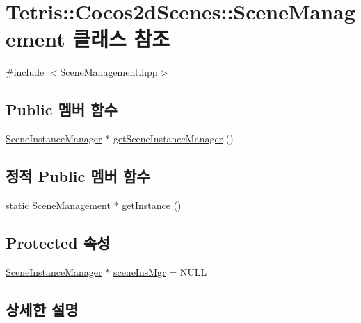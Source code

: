 \hypertarget{class_tetris_1_1_cocos2d_scenes_1_1_scene_management}{}\section{Tetris\+:\+:Cocos2d\+Scenes\+:\+:Scene\+Management 클래스 참조}
\label{class_tetris_1_1_cocos2d_scenes_1_1_scene_management}


{\ttfamily \#include $<$Scene\+Management.\+hpp$>$}

\subsection*{Public 멤버 함수}
\begin{DoxyCompactItemize}
\item 
\hyperlink{class_tetris_1_1_cocos2d_scenes_1_1_scene_instance_manager}{Scene\+Instance\+Manager} $\ast$ \hyperlink{class_tetris_1_1_cocos2d_scenes_1_1_scene_management_a4a4ea58177afffd49857182c961eb5f3}{get\+Scene\+Instance\+Manager} ()
\end{DoxyCompactItemize}
\subsection*{정적 Public 멤버 함수}
\begin{DoxyCompactItemize}
\item 
static \hyperlink{class_tetris_1_1_cocos2d_scenes_1_1_scene_management}{Scene\+Management} $\ast$ \hyperlink{class_tetris_1_1_cocos2d_scenes_1_1_scene_management_a34a3edec2de526ee179491cc6ae8aac3}{get\+Instance} ()
\end{DoxyCompactItemize}
\subsection*{Protected 속성}
\begin{DoxyCompactItemize}
\item 
\hyperlink{class_tetris_1_1_cocos2d_scenes_1_1_scene_instance_manager}{Scene\+Instance\+Manager} $\ast$ \hyperlink{class_tetris_1_1_cocos2d_scenes_1_1_scene_management_a0ac07876072adcaefdcb86f9911475ba}{scene\+Ins\+Mgr} = N\+U\+LL
\end{DoxyCompactItemize}


\subsection{상세한 설명}


